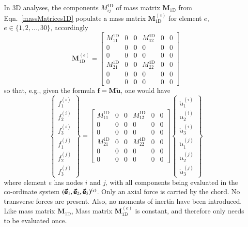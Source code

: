 In 3D analyses, the components $M^{\mathrm{1D}}_{ij}$ of mass matrix $\mathbf{M}_{\mathrm{1D}}$ from Eqn.~\eqref{massMatrices1D} populate a mass matrix $\boldsymbol{M}_{\mathrm{1D}}^{(e)}$ for element $e$, $e \in \{ 1,2,\ldots,30 \}$, accordingly
\begin{equation}
    \boldsymbol{M}_{\mathrm{1D}}^{(e)} = 
    \left[ \begin{array}{ccc|ccc}
    M_{11}^{\mathrm{1D}} & 0 & 0 & M_{12}^{\mathrm{1D}} & 0 & 0 \\
    0 & 0 & 0 & 0 & 0 & 0 \\
    0 & 0 & 0 & 0 & 0 & 0 \\ \hline
    M_{21}^{\mathrm{1D}} & 0 & 0 & M_{22}^{\mathrm{1D}} & 0 & 0 \\
    0 & 0 & 0 & 0 & 0 & 0 \\
    0 & 0 & 0 & 0 & 0 & 0
    \end{array} \right]
    \label{elementMassMatrix1D}
\end{equation}
so that, e.g., given the formula $\mathbf{f} = \mathbf{M} \ddot{\mathbf{u}}$, one would have
\begin{displaymath}
    \left\{ \begin{matrix}
    f^{(i)}_1 \\ f^{(i)}_2 \\ f^{(i)}_3 \\ \hline
    f^{(j)}_1 \\ f^{(j)}_2 \\ f^{(j)}_3
    \end{matrix} \right\} = 
    \left[ \begin{array}{ccc|ccc}
    M_{11}^{\mathrm{1D}} & 0 & 0 & M_{12}^{\mathrm{1D}} & 0 & 0 \\
    0 & 0 & 0 & 0 & 0 & 0 \\
    0 & 0 & 0 & 0 & 0 & 0 \\ \hline
    M_{21}^{\mathrm{1D}} & 0 & 0 & M_{22}^{\mathrm{1D}} & 0 & 0 \\
    0 & 0 & 0 & 0 & 0 & 0 \\
    0 & 0 & 0 & 0 & 0 & 0
    \end{array} \right] \left\{ \begin{matrix} 
    \ddot{u}^{(i)}_1 \\ \ddot{u}^{(i)}_2 \\ \ddot{u}^{(i)}_3 \\ \hline
    \ddot{u}^{(j)}_1 \\ \ddot{u}^{(j)}_2 \\ \ddot{u}^{(j)}_3
    \end{matrix} \right\} 
\end{displaymath}
where element $e$ has nodes $i$ and $j$, with all components being evaluated in the co-ordinate system $( \vec{\boldsymbol{\mathsf{e}}}_1 , \vec{\boldsymbol{\mathsf{e}}}_2 , \vec{\boldsymbol{\mathsf{e}}}_3 )^{(e)}$.  Only an axial force is carried by the chord.  No transverse forces are present.  Also, no moments of inertia have been introduced.  Like mass matrix $\mathbf{M}_{\mathrm{1D}}$, Mass matrix $\boldsymbol{M}_{\mathrm{1D}}^{(e)}$ is constant, and therefore only needs to be evaluated once.

